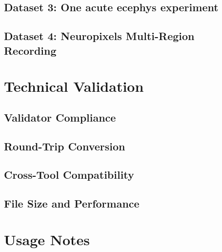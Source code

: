 \documentclass[fleqn,10pt]{wlscirep}
\begin{document}
\subsection*{Dataset 3: One acute ecephys experiment}

\subsection*{Dataset 4: Neuropixels Multi-Region Recording}

\section*{Technical Validation}



\subsection*{Validator Compliance}

\subsection*{Round-Trip Conversion}

\subsection*{Cross-Tool Compatibility}

\subsection*{File Size and Performance}


\section*{Usage Notes}

\end{document}
